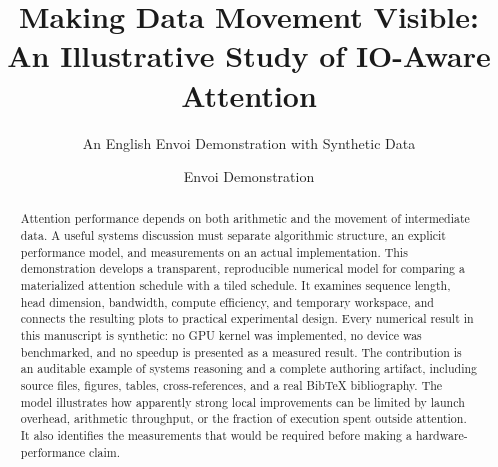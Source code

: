 \documentclass[sigconf,nonacm]{acmart}
\title{Making Data Movement Visible: An Illustrative Study of IO-Aware Attention}
\subtitle{An English Envoi Demonstration with Synthetic Data}
\author{Envoi Demonstration}
\affiliation{\institution{Illustrative manuscript, not a research affiliation}\city{}\country{}}
\begin{document}
\begin{abstract}
Attention performance depends on both arithmetic and the movement of intermediate data. A useful systems discussion must separate algorithmic structure, an explicit performance model, and measurements on an actual implementation. This demonstration develops a transparent, reproducible numerical model for comparing a materialized attention schedule with a tiled schedule. It examines sequence length, head dimension, bandwidth, compute efficiency, and temporary workspace, and connects the resulting plots to practical experimental design. Every numerical result in this manuscript is synthetic: no GPU kernel was implemented, no device was benchmarked, and no speedup is presented as a measured result. The contribution is an auditable example of systems reasoning and a complete authoring artifact, including source files, figures, tables, cross-references, and a real BibTeX bibliography. The model illustrates how apparently strong local improvements can be limited by launch overhead, arithmetic throughput, or the fraction of execution spent outside attention. It also identifies the measurements that would be required before making a hardware-performance claim.
\end{abstract}
\maketitle










\appendix

\end{document}
